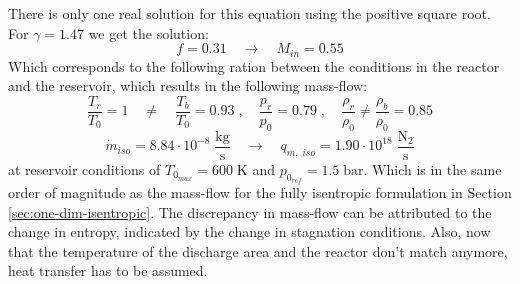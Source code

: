 	There is only one real solution for this equation using the positive square root.
	For $\gamma = 1.47$ we get the solution:
	$$
		f = 0.31
			\quad \to \quad
		M_{in} = 0.55
	$$
	Which corresponds to the following ration between the conditions in the reactor and the reservoir, which results in the following mass-flow:
	$$
		\frac{T_r}{T_0} = 1 \quad \neq \quad \frac{T_b}{T_0} = 0.93\;,
			\quad
		\frac{p_r}{p_0} = 0.79\;,
			\quad
		\frac{\rho_r}{\rho_0} \neq \frac{\rho_b}{\rho_0} = 0.85
	$$
	$$
		\dot{m}_{iso} = 8.84 \cdot 10^{-8} \; \frac{\text{kg}}{\text{s}}
			\quad \rightarrow \quad
		q_{m,\;iso} = 1.90 \cdot 10^{18} \; \frac{\text{N}_2}{\text{s}}
	$$
	at reservoir conditions of $T_{0_{max}} = 600\;\text{K}$ and $p_{0_{ref}} = 1.5\;\text{bar}$.
	Which is in the same order of magnitude as the mass-flow for the fully isentropic formulation in Section \ref{sec:one-dim-isentropic}.
	The discrepancy in mass-flow can be attributed to the change in entropy, indicated by the change in stagnation conditions.
	Also, now that the temperature of the discharge area and the reactor don't match anymore, heat transfer has to be assumed.

